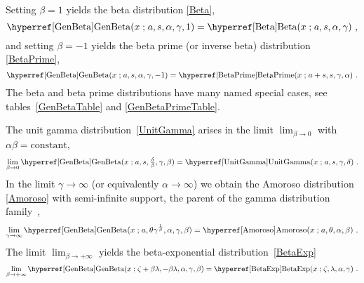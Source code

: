 Setting $\beta=1$ yields the beta  distribution \eqref{Beta}, 
\[
\opr{GenBeta}(x\given a,s,\alpha, \gamma,1) = \opr{Beta}(x\given a,s,\alpha,\gamma) \ , \checked
\notag
\]
and setting $\beta=-1$ yields the beta prime (or inverse beta) distribution \eqref{BetaPrime},  
\[
\opr{GenBeta}(x\given a,s,\alpha, \gamma,-1) = \opr{BetaPrime}(x\given a+s,s,\gamma,\alpha) \ . \checked
\notag
\]
The beta  and beta prime  distributions have many named special cases, see tables~\ref{GenBetaTable} and \ref{GenBetaPrimeTable}.


The unit gamma distribution~\eqref{UnitGamma} arises in the limit $\lim_{\beta\rightarrow0}$ with $\alpha\beta=\text{constant}$,
\[
 \lim_{\beta\rightarrow0 } \opr{GenBeta}(x\given a,s,\tfrac{\delta}{\beta}, \gamma,\beta)  = \opr{UnitGamma}(x\given a, s, \gamma,\delta) \ . \checked
 \notag
\]
In the  limit $\gamma\rightarrow\infty$ (or equivalently $\alpha\rightarrow\infty$) we obtain the Amoroso distribution \eqref{Amoroso} with semi-infinite support, the parent of the gamma distribution family~\cite{McDonald1984},
\[
\lim_{\gamma\rightarrow\infty} \opr{GenBeta}(x\given a, \theta \gamma^{\frac{1}{\beta}} ,\alpha, \gamma, \beta ) = \opr{Amoroso}(x\given a,\theta,\alpha, \beta) \ . \checked
\notag
\]
The limit  $\lim_{\beta\rightarrow+\infty }$ yields the beta-exponential distribution~\eqref{BetaExp}
\[
 \lim_{\beta\rightarrow+\infty } \opr{GenBeta}(x\given \pLoc+\beta\lambda,-\beta\pScale,\alpha,\gamma,\beta) = \opr{BetaExp}(x\given \pLoc,\pScale,\alpha, \gamma) \checked
\ .
\notag
\]




